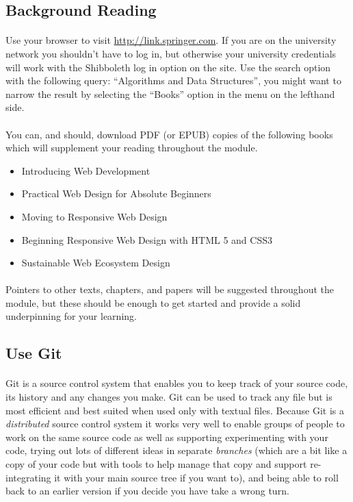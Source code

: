 \documentclass[10pt, a4paper, twosize]{article}
\begin{document}
\subsection{Background Reading}

\paragraph{} Use your browser to visit \url{http://link.springer.com}. If you are on the university network you shouldn't have to log in, but otherwise your university credentials will work with the Shibboleth log in option on the site. Use the search option with the following query: ``Algorithms and Data Structures'', you might want to narrow the result by selecting the ``Books'' option in the menu on the lefthand side.

\paragraph{} You can, and should, download PDF (or EPUB) copies of the following books which will supplement your reading throughout the module.

\begin{itemize}

\item Introducing Web Development
\item Practical Web Design for Absolute Beginners
\item Moving to Responsive Web Design
\item Beginning Responsive Web Design with HTML 5 and CSS3
\item Sustainable Web Ecosystem Design

\end{itemize}

\paragraph{} Pointers to other texts, chapters, and papers will be suggested throughout the module, but these should be enough to get started and provide a solid underpinning for your learning.

\subsection{ Use Git}
\paragraph{} Git is a source control system that enables you to keep track of your source code, its history and any changes you make. Git can be used to track any file but is most efficient and best suited when used only with textual files. Because Git is a \emph{distributed} source control system it works very well to enable groups of people to work on the same source code as well as supporting experimenting with your code, trying out lots of different ideas in separate \emph{branches} (which are a bit like a copy of your code but with tools to help manage that copy and support re-integrating it with your main source tree if you want to), and being able to roll back to an earlier version if you decide you have take a wrong turn.
\end{document}
